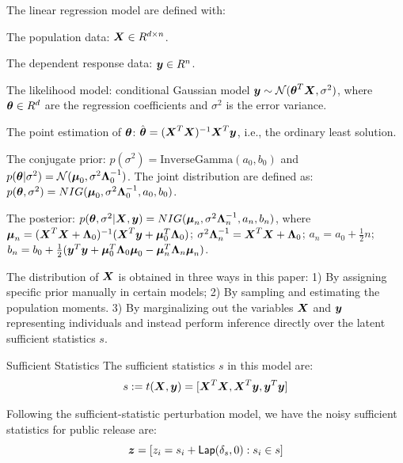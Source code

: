 \documentclass{article}
\begin{document}
%
\begin{defn}
The linear regression model are defined with:

The population data: $\boldsymbol{X} \in R^{d \times n}$.

The dependent response data: $\boldsymbol{y} \in R^{n}$.

The likelihood model: conditional Gaussian model 
$\boldsymbol{y} \sim \mathcal{N}(\boldsymbol{\theta}^{T} \boldsymbol{X}, \sigma^2)$,
where $\boldsymbol{\theta} \in R^d$ are the regression coefficients and
$\sigma^2$ is the error variance.

The point estimation of $\boldsymbol{\theta}$: 
$\hat{\boldsymbol{\theta}} = (\boldsymbol{X}^T \boldsymbol{X})^{-1} \boldsymbol{X}^T \boldsymbol{y}$, 
i.e., the ordinary least solution.

The conjugate prior: $p(\sigma^2) = \text{InverseGamma}(a_0, b_0 )$ 
and $p(\boldsymbol{\theta} | \sigma^2) = \mathcal{N} (\boldsymbol{\mu}_0 , \sigma^2\boldsymbol{\Lambda}_0^{-1})$. 
The joint distribution are defined as:
$p(\boldsymbol{\theta}, \sigma^2) = NIG(\boldsymbol{\mu}_0, \sigma^2\boldsymbol{\Lambda}_0^{-1}, a_0, b_0)$.

The posterior: 
$p(\boldsymbol{\theta}, \sigma^2 | \boldsymbol{X}, \boldsymbol{y}) = 
NIG (\boldsymbol{\mu}_n, \sigma^2\boldsymbol{\Lambda}_n^{-1}, a_n, b_n)$, where 
$\boldsymbol{\mu}_n = (\boldsymbol{X}^T \boldsymbol{X} + \boldsymbol{\Lambda}_0)^{-1}
(\boldsymbol{X}^T \boldsymbol{y} + \boldsymbol{\mu}_0^{T}\boldsymbol{\Lambda}_0)$;
$\sigma^2\boldsymbol{\Lambda}_n^{-1} = \boldsymbol{X}^T \boldsymbol{X} + \boldsymbol{\Lambda}_0$;
$a_n = a_0 + \frac{1}{2}n$;
$b_n = b_0 + \frac{1}{2}(\boldsymbol{y}^T\boldsymbol{y} 
+ \boldsymbol{\mu}_0^{T}\boldsymbol{\Lambda}_0 \boldsymbol{\mu}_0
- \boldsymbol{\mu}_n^{T}\boldsymbol{\Lambda}_n \boldsymbol{\mu}_n)$.

The distribution of $\boldsymbol{X}$
is obtained in three ways in this paper:
1) By assigning specific prior manually in certain models;
2) By sampling and estimating the population moments.
3) By marginalizing out the variables $\boldsymbol{X}$ and $\boldsymbol{y}$ representing individuals and
instead perform inference directly over the latent sufficient statistics $s$.
\end{defn}

\begin{defn}{Sufficient Statistics}
The sufficient statistics $s$ in this model are:
\[
	s := t(\boldsymbol{X}, \boldsymbol{y}) = [\boldsymbol{X}^T \boldsymbol{X}, \boldsymbol{X}^T \boldsymbol{y}, \boldsymbol{y}^T\boldsymbol{y}]
\]
\end{defn}

\begin{defn}
Following the sufficient-statistic perturbation model, we have the noisy sufficient statistics for public release are:
\[
	\boldsymbol{z} = [z_i = s_i + \mathsf{Lap}(\delta_s, 0) : s_i \in s]
\]
\end{defn}
\end{document}
